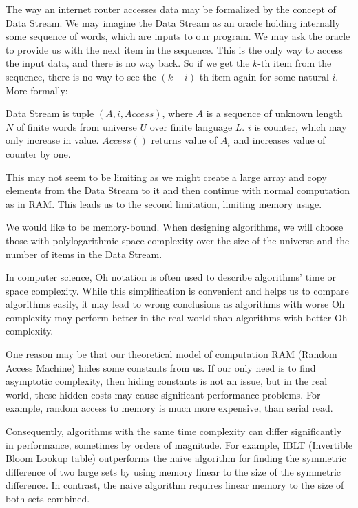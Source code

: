 The way an internet router accesses data may be formalized by the concept of Data Stream.
We may imagine the Data Stream as an oracle holding internally some sequence of words, which are inputs to our program. We may ask the oracle to provide us with the next item in the sequence. This is the only way to access the input data, and there is no way back. So if we get the \(k\)-th item from the sequence, there is no way to see the \((k-i)\)-th item again for some natural \(i\). More formally:

\begin{defn}
Data Stream is tuple $(A, i, Access)$, where $A$ is a sequence of unknown length \(N\) of finite words from universe $U$ over finite language $L$. $i$ is counter, which may only increase in value. $Access()$ returns value of $A_i$ and increases value of counter by one.
\end{defn}

This may not seem to be limiting as we might create a large array and copy elements from the Data Stream to it and then continue with normal computation as in RAM. This leads us to the second limitation, limiting memory usage.

We would like to be memory-bound. When designing algorithms, we will choose those with polylogarithmic space complexity over the size of the universe and the number of items in the Data Stream.

In computer science, Oh notation is often used to describe algorithms' time or space complexity. While this simplification is convenient and helps us to compare algorithms easily, it may lead to wrong conclusions as algorithms with worse Oh complexity may perform better in the real world than algorithms with better Oh complexity.

One reason may be that our theoretical model of computation RAM (Random Access Machine) hides some constants from us. 
If our only need is to find asymptotic complexity, then hiding constants is not an issue, but in the real world, these hidden costs may cause significant performance problems. For example, random access to memory is much more expensive, than serial read.

Consequently, algorithms with the same time complexity can differ significantly in performance, sometimes by orders of magnitude. For example, IBLT (Invertible Bloom Lookup table) outperforms the naive algorithm for finding the symmetric difference of two large sets by using memory linear to the size of the symmetric difference. In contrast, the naive algorithm requires linear memory to the size of both sets combined.


